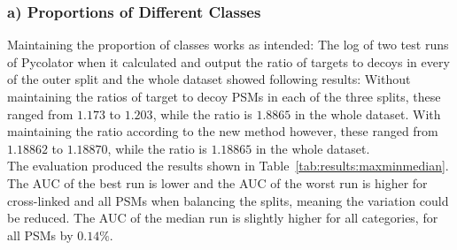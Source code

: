 \subsubsection{a) Proportions of Different Classes}
\label{lab:results:proportions}
Maintaining the proportion of classes works as intended: The log of two test runs of Pycolator when it calculated and output the ratio of targets to decoys in every of the outer split and the whole dataset showed following results: Without maintaining the ratios of target to decoy PSMs in each of the three splits, these ranged from $1.173$ to $1.203$, while the ratio is $1.8865$ in the whole dataset. With maintaining the ratio according to the new method however, these ranged from $1.18862$ to $1.18870$, while the ratio is $1.18865$ in the whole dataset.\\
The evaluation produced the results shown in
Table~\ref{tab:results:maxminmedian}. The AUC of the best run is lower and the AUC of the worst run is higher for cross-linked and all PSMs when balancing the splits, meaning the variation could be reduced. The AUC of the median run is slightly higher for all categories, for all PSMs by $0.14\%$. 
\renewcommand{\baselinestretch}{0.9}
